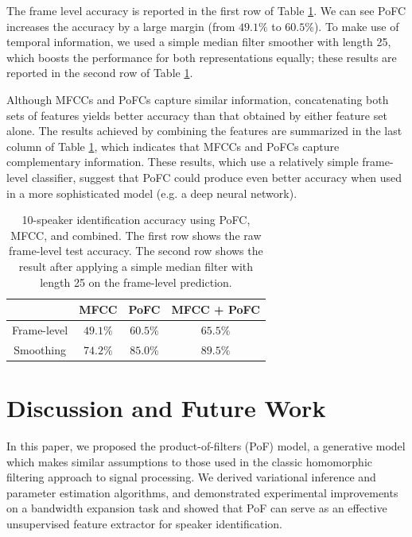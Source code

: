 \documentclass{article} %
\begin{document}
The frame level accuracy is reported in the first row of Table
\ref{tab:spk}. We can see PoFC increases the accuracy by a large
margin (from $49.1\%$ to $60.5\%$). To make use of temporal
information, we used a simple median filter smoother with length 25,
which boosts the performance for both representations equally; these
results are reported in the second row of Table \ref{tab:spk}.

Although MFCCs and PoFCs capture similar information, concatenating
both sets of features yields better accuracy than that obtained by
either feature set alone. The results achieved by combining the
features are summarized in the last column of Table \ref{tab:spk},
which indicates that MFCCs and PoFCs capture complementary
information. These results, which use a relatively simple frame-level
classifier, suggest that PoFC could produce even better accuracy when
used in a more sophisticated model (e.g. a deep neural network).

\begin{table}[t]
\caption{10-speaker identification accuracy using PoFC, MFCC, and combined. The first row shows the raw frame-level test accuracy. The second row shows the result after applying a simple median filter with length 25 on the frame-level prediction.}
\begin{center}
\begin{tabular}{| c || c | c | c |}
  \hline                        
   & MFCC & PoFC & MFCC + PoFC \\ \hline
  Frame-level & $49.1\%$ & $60.5\%$  & $65.5\%$\\ \hline
  Smoothing  & $74.2\%$ & $85.0\%$ & $89.5\%$\\
  \hline  
\end{tabular}\label{tab:spk}
\end{center}
\end{table}

\section{Discussion and Future Work}
In this paper, we proposed the product-of-filters (PoF) model, a
generative model which makes similar assumptions to those used in the
classic homomorphic filtering approach to signal processing. We
derived variational inference and parameter estimation algorithms,
and demonstrated experimental improvements on a
bandwidth expansion task and showed that PoF can serve as an effective
unsupervised feature extractor for speaker identification.
\end{document}
